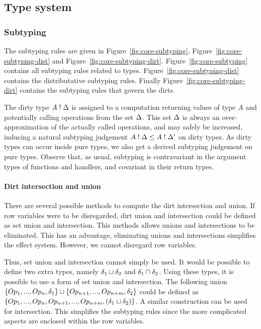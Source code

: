 \subsection{Type system}

\subsubsection{Subtyping}
The subtyping rules are given in Figure~\ref{fig:core-subtyping}, Figure~\ref{fig:core-subtyping-dist} and Figure~\ref{fig:core-subtyping-dirt}. Figure~\ref{fig:core-subtyping} contains all subtyping rules related to types. Figure~\ref{fig:core-subtyping-dist} contains the distributative subtyping rules. Finally Figure~\ref{fig:core-subtyping-dirt} contains the subtyping rules that govern the dirts.

The dirty type $A \mathrel{!} \Delta$ is assigned to a computation returning values of type $A$ and potentially calling operations from the set $\Delta$. This set $\Delta$ is always an over-approximation of the actually called operations, and may safely be increased, inducing a natural subtyping judgement $A \mathrel{!} \Delta \leq A \mathrel{!} \Delta'$ on dirty types. As dirty types can occur inside pure types, we also get a derived subtyping judgement on pure types. Observe that, as usual, subtyping is contravariant in the argument types of functions and handlers, and covariant in their return types.

\paragraph{Dirt intersection and union}
There are several possible methods to compute the dirt intersection and union. If row variables were to be disregarded, dirt union and intersection could be defined as set union and intersection. This methods allows unions and intersections to be eliminated. This has an advantage, eliminating unions and intersections simplifies the effect system. However, we cannot disregard row variables.

Thus, set union and intersection cannot simply be used. It would be possible to define two extra types, namely $\delta_1 \sqcup \delta_2$ and $\delta_1 \sqcap \delta_2$. Using these types, it is possible to use a form of set union and intersection. The following union $\{Op_1, ..., Op_n, \delta_1\} \sqcup \{Op_{n+1}, ..., Op_{n+m}, \delta_2\}$ could be defined as $\{Op_1, ..., Op_n, Op_{n+1}, ..., Op_{n+m}, (\delta_1 \sqcup \delta_2)\}$. A similar construction can be used for intersection. This simplifies the subtyping rules since the more complicated aspects are enclosed within the row variables.


